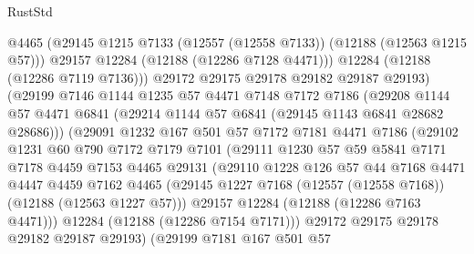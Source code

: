 \begin{lexlean}{RustStd}
\begin{coremodule}
                      @4465
                      (@29145 @1215 @7133 (@12557 (@12558 @7133)) (@12188 (@12563 @1215 @57)))
                      @29157
                      @12284
                      (@12188 (@12286 @7128 @4471)))
                    @12284
                    (@12188 (@12286 @7119 @7136)))
                  @29172
                  @29175
                  @29178
                  @29182
                  @29187
                  @29193)
                (@29199
                  @7146
                  @1144
                  @1235
                  @57
                  @4471
                  @7148
                  @7172
                  @7186
                  (@29208
                    @1144
                    @57
                    @4471
                    @6841
                    (@29214 @1144 @57 @6841 (@29145 @1143 @6841 @28682 @28686)))
                  (@29091
                    @1232
                    @167
                    @501
                    @57
                    @7172
                    @7181
                    @4471
                    @7186
                    (@29102
                      @1231
                      @60
                      @790
                      @7172
                      @7179
                      @7101
                      (@29111
                        @1230
                        @57
                        @59
                        @5841
                        @7171
                        @7178
                        @4459
                        @7153
                        @4465
                        @29131
                        (@29110
                          @1228
                          @126
                          @57
                          @44
                          @7168
                          @4471
                          @4447
                          @4459
                          @7162
                          @4465
                          (@29145 @1227 @7168 (@12557 (@12558 @7168)) (@12188 (@12563 @1227 @57)))
                          @29157
                          @12284
                          (@12188 (@12286 @7163 @4471)))
                        @12284
                        (@12188 (@12286 @7154 @7171)))
                      @29172
                      @29175
                      @29178
                      @29182
                      @29187
                      @29193)
                    (@29199
                      @7181
                      @167
                      @501
                      @57

\end{coremodule}
\end{lexlean}

